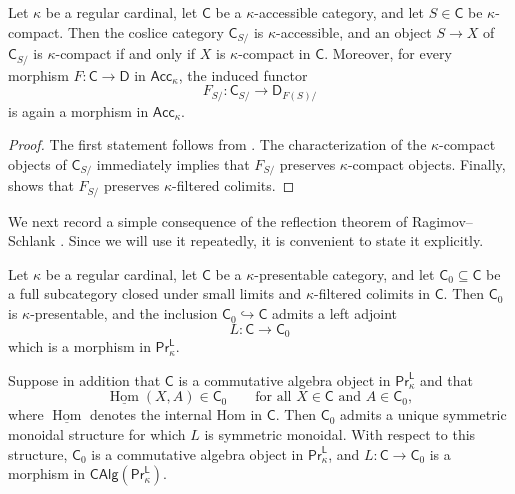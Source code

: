 \begin{proposition}\label{lemma on accessible coslices}
Let $\kappa$ be a regular cardinal, let $\mathsf{C}$ be a $\kappa$-accessible category, and let $S\in\mathsf{C}$ be $\kappa$-compact. Then the coslice category $\mathsf{C}_{S/}$ is $\kappa$-accessible, and an object $S\to X$ of $\mathsf{C}_{S/}$ is $\kappa$-compact if and only if $X$ is $\kappa$-compact in $\mathsf{C}$. Moreover, for every morphism $F\colon \mathsf{C}\to \mathsf{D}$ in $\mathsf{Acc}_\kappa$, the induced functor
\[F_{S/}\colon \mathsf{C}_{S/}\to \mathsf{D}_{F(S)/}\]
is again a morphism in $\mathsf{Acc}_\kappa$.
\end{proposition}

\begin{proof}
The first statement follows from \cite[Tags~\href{https://kerodon.net/tag/06HW}{06HW} and \href{https://kerodon.net/tag/06LJ}{06LJ}]{kerodon}. The characterization of the $\kappa$-compact objects of $\mathsf{C}_{S/}$ immediately implies that $F_{S/}$ preserves $\kappa$-compact objects. Finally, \cite[Tags~\href{https://kerodon.net/tag/0236}{0236}, \href{https://kerodon.net/tag/02KT}{02KT}, and \href{https://kerodon.net/tag/02PH}{02PH}]{kerodon} shows that $F_{S/}$ preserves $\kappa$-filtered colimits.
\end{proof}

We next record a simple consequence of the reflection theorem of Ragimov--Schlank \cite[Thm.~1.1]{reflectionprinciple}. Since we will use it repeatedly, it is convenient to state it explicitly.

\begin{proposition}\label{enhanced reflection theorem}
Let $\kappa$ be a regular cardinal, let $\mathsf{C}$ be a $\kappa$-presentable category, and let $\mathsf{C}_0\subseteq\mathsf{C}$ be a full subcategory closed under small limits and $\kappa$-filtered colimits in $\mathsf{C}$. Then $\mathsf{C}_0$ is $\kappa$-presentable, and the inclusion $\mathsf{C}_0\hookrightarrow\mathsf{C}$ admits a left adjoint
\[L\colon\mathsf{C}\to\mathsf{C}_0\]
which is a morphism in $\mathsf{Pr}^{\mathsf{L}}_\kappa$.

Suppose in addition that $\mathsf{C}$ is a commutative algebra object in $\mathsf{Pr}^{\mathsf{L}}_\kappa$ and that
\[\underline{\operatorname{Hom}}(X,A)\in\mathsf{C}_0\qquad\text{for all }X\in\mathsf{C}\text{ and }A\in\mathsf{C}_0,\]
where $\underline{\operatorname{Hom}}$ denotes the internal Hom in $\mathsf{C}$. Then $\mathsf{C}_0$ admits a unique symmetric monoidal structure for which $L$ is symmetric monoidal. With respect to this structure, $\mathsf{C}_0$ is a commutative algebra object in $\mathsf{Pr}^{\mathsf{L}}_\kappa$, and $L\colon\mathsf{C}\to\mathsf{C}_0$ is a morphism in $\mathsf{CAlg}(\mathsf{Pr}^{\mathsf{L}}_\kappa)$.
\end{proposition}


